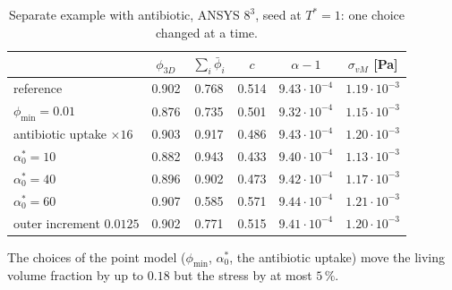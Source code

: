 \begin{table}[htbp]
  \centering
  \caption[Sensitivity of the coupled example]{%
    Separate example with antibiotic, ANSYS $8^3$, seed at $T^*=1$: one choice changed at a time.}
  \label{tab:ch5-living-sens}
  \begin{tabular}{lccccc}
    \toprule
    & $\phi_{3D}$ & $\sum_i\bar\phi_i$ & $c$ & $\alpha-1$ & $\sigma_{vM}$ [Pa]\\
    \midrule
    reference & 0.902 & 0.768 & 0.514 & $9.43\cdot10^{-4}$ & $1.19\cdot10^{-3}$\\
    $\phi_{\min}=0.01$ & 0.876 & 0.735 & 0.501 & $9.32\cdot10^{-4}$ & $1.15\cdot10^{-3}$\\
    antibiotic uptake $\times16$ & 0.903 & 0.917 & 0.486 & $9.43\cdot10^{-4}$ & $1.20\cdot10^{-3}$\\
    $\alpha^*_0=10$ & 0.882 & 0.943 & 0.433 & $9.40\cdot10^{-4}$ & $1.13\cdot10^{-3}$\\
    $\alpha^*_0=40$ & 0.896 & 0.902 & 0.473 & $9.42\cdot10^{-4}$ & $1.17\cdot10^{-3}$\\
    $\alpha^*_0=60$ & 0.907 & 0.585 & 0.571 & $9.44\cdot10^{-4}$ & $1.21\cdot10^{-3}$\\
    outer increment $0.0125$ & 0.902 & 0.771 & 0.515 & $9.41\cdot10^{-4}$ & $1.20\cdot10^{-3}$\\
    \bottomrule
  \end{tabular}
\end{table}

The choices of the point model ($\phi_{\min}$, $\alpha^*_0$, the antibiotic uptake) move the living volume
fraction by up to $0.18$ but the stress by at most $5\,\%$.

